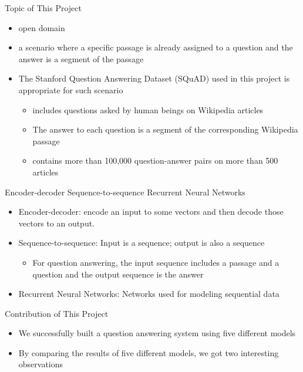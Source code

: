 \documentclass{beamer}
\begin{document}
\begin{frame}{Topic of This Project}
    \begin{itemize}
        \item open domain
        \item a scenario where a specific passage is already assigned to a question and the answer is a segment of the passage
        \item The Stanford Question Answering Dataset (SQuAD) used in this project is appropriate for such scenario
            \begin{itemize}
                \item includes questions asked by human beings on Wikipedia articles
                \item The answer to each question is a segment of the corresponding Wikipedia passage
                \item contains more than 100,000 question-answer pairs on more than 500 articles
            \end{itemize}
    \end{itemize}
\end{frame}

\begin{frame}{Encoder-decoder Sequence-to-sequence Recurrent Neural Networks}
   \begin{itemize}
       \item Encoder-decoder:  encode an input to some vectors and then decode those vectors to an output.
       \item Sequence-to-sequence: Input is a sequence; output is also a sequence
            \begin{itemize}
                \item For question answering, the input sequence includes a passage and a question and the output sequence is the answer
            \end{itemize}
       \item Recurrent Neural Networks: Networks used for modeling sequential data

   \end{itemize}
\end{frame}

\begin{frame}{Contribution of This Project}
    \begin{itemize}
        \item We successfully built a question answering system using five different models
        \item By comparing the results of five different models, we got two interesting observations
    \end{itemize}
\end{frame}
\end{document}
